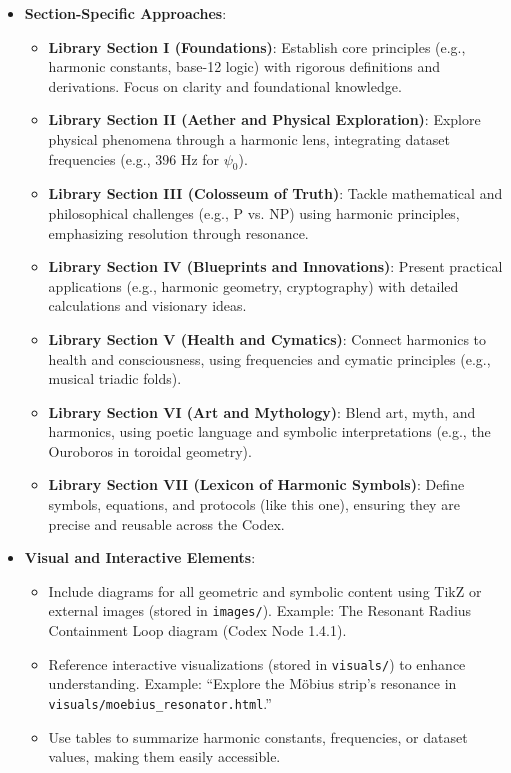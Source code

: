 \begin{itemize}
    \item \textbf{Section-Specific Approaches}: 
    \begin{itemize}
        \item \textbf{Library Section I (Foundations)}: Establish core principles (e.g., harmonic constants, base-12 logic) with rigorous definitions and derivations. Focus on clarity and foundational knowledge.
        \item \textbf{Library Section II (Aether and Physical Exploration)}: Explore physical phenomena through a harmonic lens, integrating dataset frequencies (e.g., 396 Hz for \(\psi_0\)).
        \item \textbf{Library Section III (Colosseum of Truth)}: Tackle mathematical and philosophical challenges (e.g., P vs. NP) using harmonic principles, emphasizing resolution through resonance.
        \item \textbf{Library Section IV (Blueprints and Innovations)}: Present practical applications (e.g., harmonic geometry, cryptography) with detailed calculations and visionary ideas.
        \item \textbf{Library Section V (Health and Cymatics)}: Connect harmonics to health and consciousness, using frequencies and cymatic principles (e.g., musical triadic folds).
        \item \textbf{Library Section VI (Art and Mythology)}: Blend art, myth, and harmonics, using poetic language and symbolic interpretations (e.g., the Ouroboros in toroidal geometry).
        \item \textbf{Library Section VII (Lexicon of Harmonic Symbols)}: Define symbols, equations, and protocols (like this one), ensuring they are precise and reusable across the Codex.
    \end{itemize}

    \item \textbf{Visual and Interactive Elements}: 
    \begin{itemize}
        \item Include diagrams for all geometric and symbolic content using TikZ or external images (stored in \texttt{images/}). Example: The Resonant Radius Containment Loop diagram (Codex Node 1.4.1).
        \item Reference interactive visualizations (stored in \texttt{visuals/}) to enhance understanding. Example: ``Explore the Möbius strip’s resonance in \texttt{visuals/moebius\_resonator.html}.''
        \item Use tables to summarize harmonic constants, frequencies, or dataset values, making them easily accessible.
    \end{itemize}


\end{itemize}
